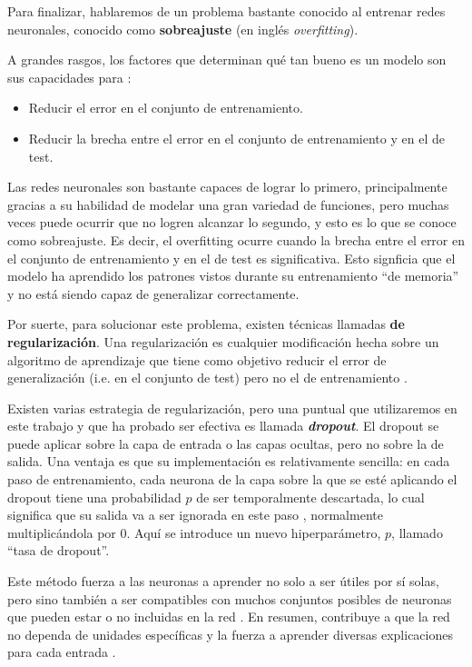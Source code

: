 \documentclass[../../main.tex]{subfiles}
\begin{document}
\bigskip
Para finalizar, hablaremos de un problema bastante conocido al entrenar redes neuronales,
conocido como \textbf{sobreajuste} (en inglés \textit{overfitting}).

A grandes rasgos, los factores que determinan qué tan bueno es un modelo son sus capacidades
para \cite{deep-learning}:
\begin{itemize}[itemsep=0.1cm]
    \item Reducir el error en el conjunto de entrenamiento.
    \item Reducir la brecha entre el error en el conjunto de entrenamiento y en el de
    test.
\end{itemize}

Las redes neuronales son bastante capaces de lograr lo primero, principalmente gracias a
su habilidad de modelar una gran variedad de funciones, pero muchas veces puede ocurrir
que no logren alcanzar lo segundo, y esto es lo que se conoce como sobreajuste. Es decir,
el overfitting ocurre cuando la brecha entre el error en el conjunto de entrenamiento y en
el de test es significativa. Esto signficia que el modelo ha aprendido los patrones vistos
durante su entrenamiento ``de memoria'' y no está siendo capaz de generalizar correctamente.

Por suerte, para solucionar este problema, existen técnicas llamadas \textbf{de
regularización}. Una regularización es cualquier modificación hecha sobre un algoritmo de
aprendizaje que tiene como objetivo reducir el error de generalización (i.e. en el
conjunto de test) pero no el de entrenamiento \cite{deep-learning}.

Existen varias estrategia de regularización, pero una puntual que utilizaremos en este
trabajo y que ha probado ser efectiva es llamada \textbf{\textit{dropout}}. El dropout se
puede aplicar sobre la capa de entrada o las capas ocultas, pero no sobre la de salida.
Una ventaja es que su implementación es relativamente sencilla: en cada paso de
entrenamiento\footnotemark, cada neurona de la capa sobre la que se esté aplicando el
dropout tiene una probabilidad \(p\) de ser temporalmente descartada, lo cual significa
que su salida va a ser ignorada en este paso \cite{hands-on-ML-sklearn-tf}, normalmente
multiplicándola por 0. Aquí se introduce un nuevo hiperparámetro, \(p\), llamado ``tasa de
dropout''.

Este método fuerza a las neuronas a aprender no solo a ser útiles por sí solas,
pero sino también a ser compatibles con muchos conjuntos posibles de neuronas que pueden
estar o no incluidas en la red \cite{ai-a-modern-approach}. En resumen, contribuye
a que la red no dependa de unidades específicas y la fuerza a aprender diversas
explicaciones para cada entrada \cite{ai-a-modern-approach}.
\end{document}

